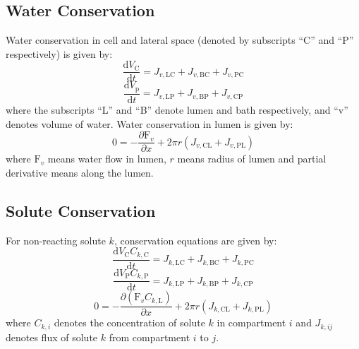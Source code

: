 \documentclass{article}
\begin{document}
\subsection{Water Conservation}
Water conservation in cell and lateral space (denoted by subscripts ``C'' and ``P'' respectively) is given by\citep{edwards2017cell}:\\
\begin{equation}
\frac{\mathrm{d} V_{\mathrm{C}}}{\mathrm{d} t}=J_{v, \mathrm{LC}}+J_{v, \mathrm{BC}}+J_{v, \mathrm{PC}}
\end{equation}
\begin{equation}
\frac{\mathrm{d} V_{\mathrm{p}}}{\mathrm{d} t}=J_{v, \mathrm{LP}}+J_{v, \mathrm{BP}}+J_{v, \mathrm{CP}}
\end{equation}
where the subscripts ``L'' and ``B'' denote lumen and bath respectively, and ``v'' denotes volume of water. Water conservation in lumen is given by:
\begin{equation}
0=-\frac{\partial \mathrm{F}_{v}}{\partial x}+2 \pi r (J_{v,\mathrm{CL}}+J_{v,\mathrm{PL}})
\end{equation}
where $\mathrm{F}_{v}$ means water flow in lumen, $r$ means radius of lumen and partial derivative means along the lumen.

\subsection{Solute Conservation}
For non-reacting solute $k$, conservation equations are given by:
\begin{equation}
\frac{\mathrm{d} V_{\mathrm{C}} C_{k, \mathrm{C}}}{\mathrm{d} t}=J_{k, \mathrm{LC}}+J_{k, \mathrm{BC}}+J_{k, \mathrm{PC}}
\end{equation}
\begin{equation}
\frac{\mathrm{d} V_{\mathrm{P}} C_{k, \mathrm{P}}}{\mathrm{d} t}=J_{k, \mathrm{LP}}+J_{k, \mathrm{BP}}+J_{k, \mathrm{CP}}
\end{equation}
\begin{equation}
0=-\frac{\partial\left(\mathrm{F}_{v} C_{k,\mathrm{L}}\right)}{\partial x}+2 \pi r (J_{k,\mathrm{CL}}+J_{k,\mathrm{PL}})
\end{equation}
where $C_{k,i}$ denotes the concentration of solute $k$ in compartment $i$ and $J_{k,ij}$ denotes flux of solute $k$ from compartment $i$ to $j$.\\
\end{document}
